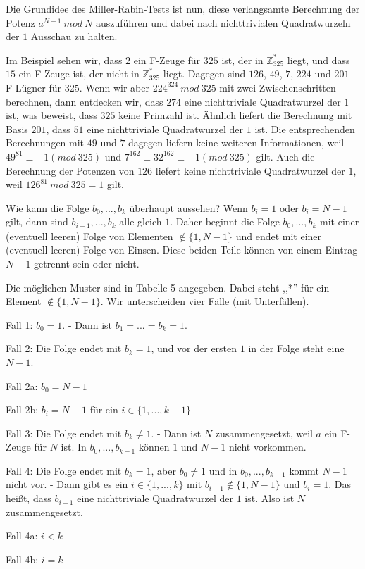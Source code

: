 \documentclass[a4paper]{article}
\begin{document}
\begin{multicols}{3}
        Die Grundidee des Miller-Rabin-Tests ist nun, diese verlangsamte Berechnung der Potenz $a^{N-1}\ mod\ N$ auszuführen und dabei nach nichttrivialen Quadratwurzeln der $1$ Ausschau zu halten.

        Im Beispiel sehen wir, dass $2$ ein F-Zeuge für $325$ ist, der in $\mathbb{Z}^*_{325}$ liegt, und dass $15$ ein F-Zeuge ist, der nicht in $\mathbb{Z}^*_{325}$ liegt. Dagegen sind $126$, $49$, $7$, $224$ und $201$ F-Lügner für $325$. Wenn wir aber $224^{324}\ mod\ 325$ mit zwei Zwischenschritten berechnen, dann entdecken wir, dass $274$ eine nichttriviale Quadratwurzel der $1$ ist, was beweist, dass $325$ keine Primzahl ist. Ähnlich liefert die Berechnung mit Basis $201$, dass $51$ eine nichttriviale Quadratwurzel der $1$ ist. Die entsprechenden Berechnungen mit $49$ und $7$ dagegen liefern keine weiteren Informationen, weil $49^{81} \equiv -1 (mod\ 325)$ und $7^{162} \equiv 32^{162} \equiv -1 (mod\ 325)$ gilt. Auch die Berechnung der Potenzen von $126$ liefert keine nichttriviale Quadratwurzel der $1$, weil $126^{81}\ mod\ 325 = 1$ gilt.

        Wie kann die Folge $b_0,...,b_k$ überhaupt aussehen? Wenn $b_i=1$ oder $b_i=N-1$ gilt, dann sind $b_{i+1},...,b_k$ alle gleich $1$. Daher beginnt die Folge $b_0,...,b_k$ mit einer (eventuell leeren) Folge von Elementen $\not\in\{1,N-1\}$ und endet mit einer (eventuell leeren) Folge von Einsen. Diese beiden Teile können von einem Eintrag $N-1$ getrennt sein oder nicht.

        Die möglichen Muster sind in Tabelle 5 angegeben. Dabei steht ,,*'' für ein Element $\not\in\{1,N-1\}$. Wir unterscheiden vier Fälle (mit Unterfällen).
        \begin{itemize*}
            \item Fall 1: $b_0 = 1$. - Dann ist $b_1 =...=b_k= 1$.
            \item Fall 2: Die Folge endet mit $b_k= 1$, und vor der ersten $1$ in der Folge steht eine $N-1$.
            \item Fall 2a: $b_0 =N-1$
            \item Fall 2b: $b_i=N-1$ für ein $i\in\{1,...,k-1\}$
            \item Fall 3: Die Folge endet mit $b_k\not= 1$. - Dann ist $N$ zusammengesetzt, weil $a$ ein F-Zeuge für $N$ ist. In $b_0,...,b_{k-1}$ können $1$ und $N-1$ nicht vorkommen.
            \item Fall 4: Die Folge endet mit $b_k=1$, aber $b_0\not= 1$ und in $b_0,...,b_{k-1}$ kommt $N-1$ nicht vor. - Dann gibt es ein $i\in\{1,...,k\}$ mit $b_{i-1}\not\in\{1,N-1\}$ und $b_i=1$. Das heißt, dass $b_{i-1}$ eine nichttriviale Quadratwurzel der $1$ ist. Also ist $N$ zusammengesetzt.
            \item Fall 4a: $i<k$
            \item Fall 4b: $i=k$
        \end{itemize*}


\end{multicols}
\end{document}

